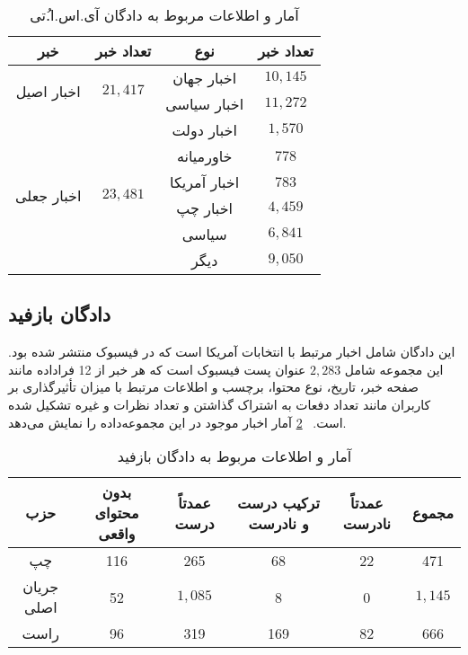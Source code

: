 \begin{table}[!h]
\caption{آمار و اطلاعات مربوط به دادگان آی.اس.ا.ُتی}
\label{ISOTDataset}
\begin{center}
\begin{tabular}{|c|c|c|c|}
\hline
خبر & 
تعداد خبر & 
 نوع & 
 تعداد خبر
 \\
\hline
\hline
\multirow{2}{*}{اخبار اصیل} 
&
\multirow{2}{*}{$21,417$}
 &
  اخبار جهان\footnotemark
& $10,145$ 
\\ 
& 
&
 اخبار سیاسی\footnotemark
& 
$11,272$ \\ 
\hline
\multirow{6}{*}{اخبار جعلی}
 &
\multirow{6}{*}{$23,481$}
&
  اخبار دولت
& $1,570$
\\
& &
 خاورمیانه
& $778$ \\ 
& & 
اخبار آمریکا
& $783$ \\
& & 
اخبار چپ
& $4,459$ \\ 
& & 
سیاسی
& $6,841$ \\ 
& & 
دیگر
& $9,050$ \\ 
\hline

\end{tabular}
\end{center}
\end{table}

\subsection{دادگان بازفید}

\noindent
این دادگان شامل اخبار مرتبط با انتخابات آمریکا است که در فیسبوک منتشر شده بود.
این مجموعه شامل $2,283$ عنوان پست فیسبوک است که هر خبر از 12 فراداده مانند
 صفحه خبر، تاریخ، نوع محتوا، برچسب و اطلاعات مرتبط با میزان تأثیرگذاری بر کاربران مانند تعداد دفعات به اشتراک گذاشتن و
 تعداد نظرات و غیره تشکیل شده ‌است. \tablename~\ref{BuzzFeedDataset} آمار اخبار موجود در این مجموعه‌داده را نمایش می‌دهد.

\begin{table}[!h]
\caption{آمار و اطلاعات مربوط به دادگان بازفید}
\label{BuzzFeedDataset}
\begin{center}
\begin{tabular}{|c|c|c|c|c|c|}
\hline
حزب & بدون محتوای واقعی & عمدتاً درست & ترکیب درست و نادرست & عمدتاً نادرست & مجموع \\
\hline
\hline
چپ & 116 & 265 & 68 & 22 & 471 \\
\hline
جریان اصلی & 52 & $1,085$ & 8 & 0 & $1,145$ \\
\hline
راست & 96 & 319 & 169 & 82 & 666 \\
\hline
\end{tabular}
\end{center}
\end{table}


